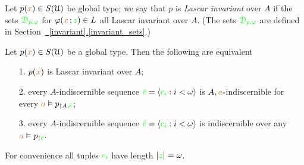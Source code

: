 \documentclass[creche.tex]{subfiles}
\begin{document}
Let $p({\color{brown} x})\in S(\EuScript U)$ be global type; we say that $p$ is \emph{Lascar invariant\/} over $A$ if the sets ${\color{green}\EuScript D_{p,\varphi}}$ for $\varphi({\color{brown} x}\,;{\color{green} z})\in L$ all Lascar invariant over $A$. (The sets ${\color{green}\EuScript D_{p,\varphi}}$ are defined in Section~\hyperref[invariant_sets]{~\ref*{invariant}.\ref*{invariant_sets}}.)

\begin{proposition}\label{prop_Lascar_indiscernibles}
  Let $p({\color{brown} x})\in S(\EuScript U)$ be a global type. Then the following are equivalent
  \begin{itemize}
    \item[1.] $p({\color{brown} x})$ is Lascar invariant over $A$;
    \item[2.] every $A$-indiscernible sequence ${\color{green}\bar c}=\langle{\color{green}c_i}:i<\omega\rangle$ is $A,{\color{brown} a}\mbox{-}$indiscernible for every ${\color{brown} a}\vDash p_{\restriction A,{\color{green}\bar c}}$;
    \item[3.] every $A$-indiscernible sequence ${\color{green}\bar c}=\langle{\color{green}c_i}:i<\omega\rangle$ is indiscernible over any ${\color{brown} a}\vDash p_{\restriction{\color{green}\bar c}}$.
  \end{itemize}
  For convenience all tuples ${\color{green} c_i}$ have length $|{\color{green} z}|=\omega$.
\end{proposition}
\end{document}
